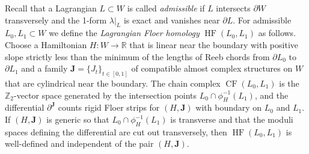 \documentclass[12pt]{article}
\theoremstyle{theorem}
\theoremstyle{definition}
\theoremstyle{remark}
\numberwithin{equation}{section}
\newcommand{\p}{\partial}
\newcommand{\R}{{\mathbb{R}}}
\newcommand{\Z}{{\mathbb{Z}}}
\DeclareMathOperator{\HF}{HF}
\DeclareMathOperator{\CF}{CF}
\begin{document}
Recall that a Lagrangian $L\subset W$ is called \emph{admissible} if $L$ intersects $\p W$ transversely and the 1-form $\lambda|_L$ is exact and vanishes near $\p L$.
For admissible $L_0,L_1\subset W$ we define the \emph{Lagrangian Floer homology} $\HF(L_0,L_1)$ as follows.
Choose a Hamiltonian $H\colon W\to \R$ that is linear near the boundary with positive slope strictly less than the minimum of the lengths of Reeb chords from $\p L_0$ to $\p L_1$ and a family ${\bm J}=\{J_t\}_{t\in [0,1]}$ of compatible almost complex structures on $W$ that are cylindrical near the boundary.
The chain complex $\CF(L_0,L_1)$ is the $\Z_2$-vector space generated by the intersection points $L_0\cap \phi_H^{-1}(L_1)$, and the differential $\p^{\bm J}$ counts rigid Floer strips for $(H,{\bm J})$ with boundary on $L_0$ and $L_1$.
If $(H,{\bm J})$ is generic so that $L_0\cap \phi^{-1}_H(L_1)$ is transverse and that the moduli spaces defining the differential are cut out transversely, then $\HF(L_0,L_1)$ is well-defined and independent of the pair $(H,{\bm J})$.
\end{document}
